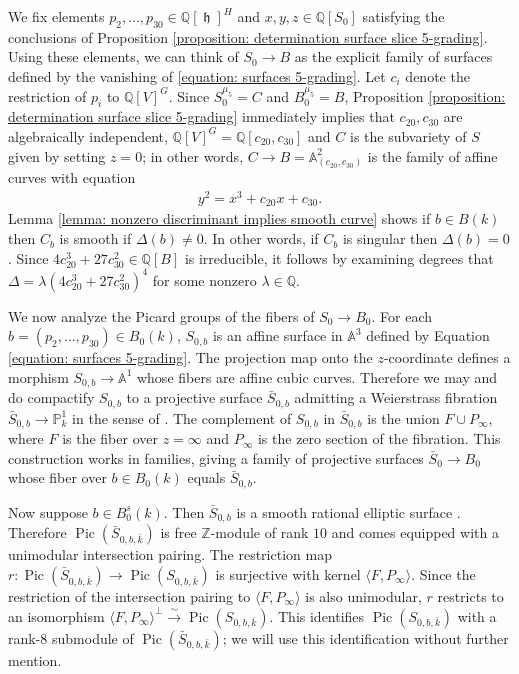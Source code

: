 \documentclass{article} %
\numberwithin{equation}{section}
\theoremstyle{definition}
\DeclareMathOperator{\lieh}{\mathfrak{h}}
\DeclareMathOperator{\Pic}{Pic}
\newcommand{\A}{\mathbb{A}}
\renewcommand{\P}{\mathbb{P}}
\newcommand{\Q}{\mathbb{Q}}
\newcommand{\Z}{\mathbb{Z}}
\begin{document}
We fix elements $p_2,\dots,p_{30} \in \Q[\lieh]^H$ and $x,y,z\in \Q[S_0]$ satisfying the conclusions of Proposition \ref{proposition: determination surface slice 5-grading}.
Using these elements, we can think of $S_0\rightarrow B$ as the explicit family of surfaces defined by the vanishing of \eqref{equation: surfaces 5-grading}.
Let $c_i$ denote the restriction of $p_i$ to $\Q[V]^G$.
Since $S_0^{\mu_5} = C$ and $B_0^{\mu_5} = B$, Proposition \ref{proposition: determination surface slice 5-grading} immediately implies that $c_{20},c_{30}$ are algebraically independent, $\Q[V]^G = \Q[c_{20},c_{30}]$ and $C$ is the subvariety of $S$ given by setting $z = 0$; in other words, $C\rightarrow B = \A^2_{(c_{20},c_{30})}$ is the family of affine curves with equation 
\begin{align}\label{equation: curves 5-grading}
    y^2  = x^3 + c_{20}x +c_{30}.
\end{align}
Lemma \ref{lemma: nonzero discriminant implies smooth curve} shows if $b\in B(k)$ then $C_b$ is smooth if $\Delta(b)\neq 0$.
In other words, if $C_b$ is singular then $\Delta(b) = 0$.
Since $4c_{20}^3+27c_{30}^2\in \Q[B]$ is irreducible, it follows by examining degrees that $\Delta = \lambda (4c_{20}^3+27c_{30}^2)^4$ for some nonzero $\lambda \in \Q$.


We now analyze the Picard groups of the fibers of $S_0\rightarrow B_0$.
For each $b = (p_2,\dots,p_{30})\in B_0(k)$, $S_{0,b}$ is an affine surface in $\A^3$ defined by Equation \eqref{equation: surfaces 5-grading}.
The projection map onto the $z$-coordinate defines a morphism $S_{0,b} \rightarrow \A^1$ whose fibers are affine cubic curves.
Therefore we may and do compactify $S_{0,b}$ to a projective surface $\bar{S}_{0,b}$ admitting a Weierstrass fibration $\bar{S}_{0,b}\rightarrow \P^1_k$ in the sense of \cite{Miranda-moduliofWeierstrassfibrations}.
The complement of $S_{0,b}$ in $\bar{S}_{0,b}$ is the union $F \cup P_{\infty}$, where $F$ is the fiber over $z=\infty$ and $P_{\infty}$ is the zero section of the fibration.
This construction works in families, giving a family of projective surfaces $\bar{S}_0\rightarrow B_0$ whose fiber over $b\in B_0(k)$ equals $\bar{S}_{0,b}$.


Now suppose $b\in B^s_0(k)$.
Then $\bar{S}_{0,b}$ is a smooth rational elliptic surface \cite[\S8]{shoidschutt-ellipticsurfaces}.
Therefore $\Pic(\bar{S}_{0,b,\bar{k}})$ is free $\Z$-module of rank $10$ and comes equipped with a unimodular intersection pairing.
The restriction map $r\colon \Pic(\bar{S}_{0,b,\bar{k}}) \rightarrow \Pic(S_{0,b,\bar{k}})$ is surjective with kernel $\langle F, P_{\infty}\rangle$.
Since the restriction of the intersection pairing to $\langle F, P_{\infty}\rangle$ is also unimodular, $r$ restricts to an isomorphism $\langle F, P_{\infty}\rangle^{\perp} \xrightarrow{\sim} \Pic(S_{0,b,\bar{k}})$.
This identifies $\Pic(S_{0,b,\bar{k}})$ with a rank-$8$ submodule of $\Pic(\bar{S}_{0,b,\bar{k}})$; we will use this identification without further mention.
\end{document}
